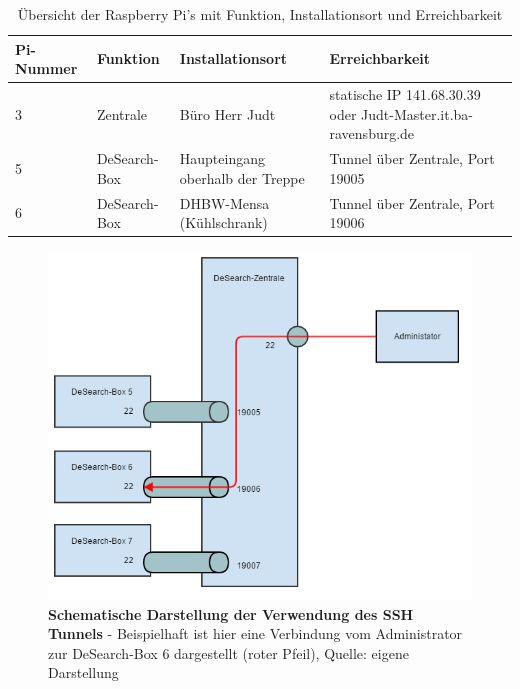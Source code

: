 \begin{table}[h]
	\begin{tabular}{ | p{} | p{} | p{4cm} | p{6cm} |}
		\hline
		\textbf{Pi-Nummer} & \textbf{Funktion} & \textbf{Installationsort} &  \textbf{Erreichbarkeit} \\ \hline
		3 & Zentrale & Büro Herr Judt & statische IP 141.68.30.39 oder \mbox{Judt-Master.it.ba-ravensburg.de} \\ \hline
		5 & DeSearch-Box & Haupteingang oberhalb der Treppe & Tunnel über Zentrale, Port 19005 \\ \hline
		6 & DeSearch-Box & DHBW-Mensa (Kühlschrank) & Tunnel über Zentrale, Port 19006 \\ \hline
		
	\end{tabular}
	\caption{Übersicht der Raspberry Pi's mit Funktion, Installationsort und Erreichbarkeit}
	\label{tab:pis}
\end{table}

\begin{figure}
	\centering
	\includegraphics[width=\textwidth]{images/tunnel.png}
	\caption[Schematische Darstellung der Verwendung des SSH Tunnels]{\textbf{Schematische Darstellung der Verwendung des SSH Tunnels} - Beispielhaft ist hier eine Verbindung vom Administrator zur DeSearch-Box 6 dargestellt (roter Pfeil), Quelle: eigene Darstellung}
	\label{fig:tunnel}
\end{figure} 

